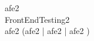 \begin{circus}
\circchannel afe2 \\
\circprocess FrontEndTesting2 \circdef \circbegin \\
	\circspot afe2 \then (afe2 \then \Skip \lpar | \lchanset afe2 \rchanset | \rpar afe2 \then \Skip) \\
\circend \\
\end{circus}

